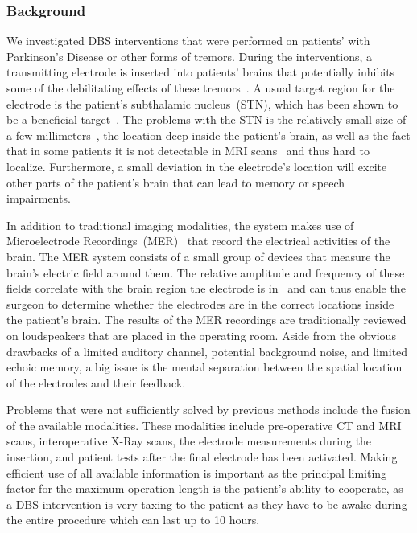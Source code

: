 \subsubsection{Background}
\label{contributions:medbio:dbs:background}
We investigated DBS interventions that were performed on patients' with Parkinson's Disease or other forms of tremors. During the interventions, a transmitting electrode is inserted into patients' brains that potentially inhibits some of the debilitating effects of these tremors~\cite{Lindberg2002}. A usual target region for the electrode is the patient's subthalamic nucleus~(STN), which has been shown to be a beneficial target~\cite{Benabid2009}. The problems with the STN is the relatively small size of a few millimeters~\cite{Richter2004}, the location deep inside the patient's brain, as well as the fact that in some patients it is not detectable in MRI scans~\cite{Starr2002} and thus hard to localize. Furthermore, a small deviation in the electrode's location will excite other parts of the patient's brain that can lead to memory or speech impairments.

In addition to traditional imaging modalities, the system makes use of Microelectrode Recordings~(MER)~\cite{Lenz1988} that record the electrical activities of the brain. The MER system consists of a small group of devices that measure the brain's electric field around them. The relative amplitude and frequency of these fields correlate with the brain region the electrode is in~\cite{benazzouz2002intraoperative} and can thus enable the surgeon to determine whether the electrodes are in the correct locations inside the patient's brain. The results of the MER recordings are traditionally reviewed on loudspeakers that are placed in the operating room. Aside from the obvious drawbacks of a limited auditory channel, potential background noise, and limited echoic memory, a big issue is the mental separation between the spatial location of the electrodes and their feedback. 

Problems that were not sufficiently solved by previous methods include the fusion of the available modalities. These modalities include pre-operative CT and MRI scans, interoperative X-Ray scans, the electrode measurements during the insertion, and patient tests after the final electrode has been activated. Making efficient use of all available information is important as the principal limiting factor for the maximum operation length is the patient's ability to cooperate, as a DBS intervention is very taxing to the patient as they have to be awake during the entire procedure which can last up to 10 hours.

